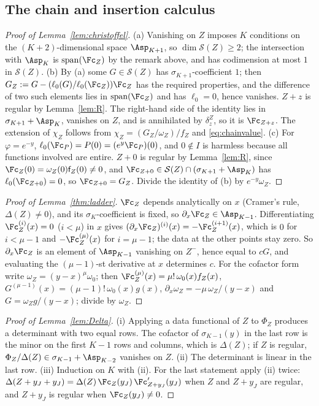 \subsection{The chain and insertion calculus}\label{app:proofs-chain}
\begin{proof}[Proof of Lemma~\textup{\ref{lem:christoffel}}]
(a) Vanishing on $Z$ imposes $K$ conditions on the $(K+2)$-dimensional space $\Asp_{K+1}$, so
$\dim\mathcal S(Z)\ge2$; the intersection with $\Asp_K$ is $\operatorname{span}(\Fc_Z)$ by the remark above, and has
codimension at most $1$ in $\mathcal S(Z)$. (b) By (a) some $G\in\mathcal S(Z)$ has $\sigma_{K+1}$-coefficient $1$;
then $G_Z:=G-(\ell_0(G)/\ell_0(\Fc_Z))\Fc_Z$ has the required properties, and the difference of two such elements
lies in $\operatorname{span}(\Fc_Z)$ and has $\ell_0=0$, hence vanishes. $Z+z$ is regular by Lemma~\ref{lem:R}. The
right-hand side of the identity lies in $\sigma_{K+1}+\Asp_K$, vanishes on $Z$, and is annihilated by
$\delta^Z_z$, so it is $\Fc_{Z+z}$. The extension of $\chi_Z$ follows from $\chi_Z=(G_Z/\omega_Z)/f_Z$ and
\eqref{eq:chainvalue}. (c) For $\varphi=e^{-y}$, $\ell_0(\Fc_P)=P(0)=(e^{y}\Fc_P)(0)$, and $0\notin I$ is harmless
because all functions involved are entire. $Z+0$ is regular by Lemma~\ref{lem:R}, since
$\Fc_Z(0)=\omega_Z(0)\mathsf f_Z(0)\ne0$, and $\Fc_{Z+0}\in\mathcal S(Z)\cap(\sigma_{K+1}+\Asp_K)$ has
$\ell_0(\Fc_{Z+0})=0$, so $\Fc_{Z+0}=G_Z$. Divide the identity of (b) by $e^{-y}\omega_Z$.
\end{proof}

\begin{proof}[Proof of Lemma~\textup{\ref{thm:ladder}}]
$\Fc_Z$ depends analytically on $x$ (Cramer's rule, $\Delta(Z)\ne0$), and its $\sigma_K$-coefficient is fixed, so
$\partial_x\Fc_Z\in\Asp_{K-1}$. Differentiating $\Fc_Z^{(i)}(x)=0$ ($i<\mu$) in $x$ gives
$(\partial_x\Fc_Z)^{(i)}(x)=-\Fc_Z^{(i+1)}(x)$, which is $0$ for $i<\mu-1$ and $-\Fc_Z^{(\mu)}(x)$ for $i=\mu-1$; the
data at the other points stay zero. So $\partial_x\Fc_Z$ is an element of $\Asp_{K-1}$ vanishing on $Z^-$, hence
equal to $cG$, and evaluating the $(\mu-1)$-st derivative at $x$ determines $c$. For the cofactor form write
$\omega_Z=(y-x)^\mu\omega_0$; then $\Fc_Z^{(\mu)}(x)=\mu!\,\omega_0(x)f_Z(x)$,
$G^{(\mu-1)}(x)=(\mu-1)!\,\omega_0(x)g(x)$, $\partial_x\omega_Z=-\mu\,\omega_Z/(y-x)$ and
$G=\omega_Zg/(y-x)$; divide by $\omega_Z$.
\end{proof}

\begin{proof}[Proof of Lemma~\textup{\ref{lem:Delta}}]
(i) Applying a data functional of $Z$ to $\Phi_Z$ produces a determinant with two equal rows. The cofactor of
$\sigma_{K-1}(y)$ in the last row is the minor on the first $K-1$ rows and columns, which is $\Delta(Z)$; if
$Z$ is regular, $\Phi_Z/\Delta(Z)\in\sigma_{K-1}+\Asp_{K-2}$ vanishes on $Z$. (ii) The determinant is linear in the
last row. (iii) Induction on $K$ with (ii). For the last statement apply (ii) twice:
$\Delta(Z+y_J+y_J)=\Delta(Z)\,\Fc_Z(y_J)\,\Fc_{Z+y_J}'(y_J)$ when $Z$ and $Z+y_J$ are regular, and $Z+y_J$ is
regular when $\Fc_Z(y_J)\ne0$.
\end{proof}

